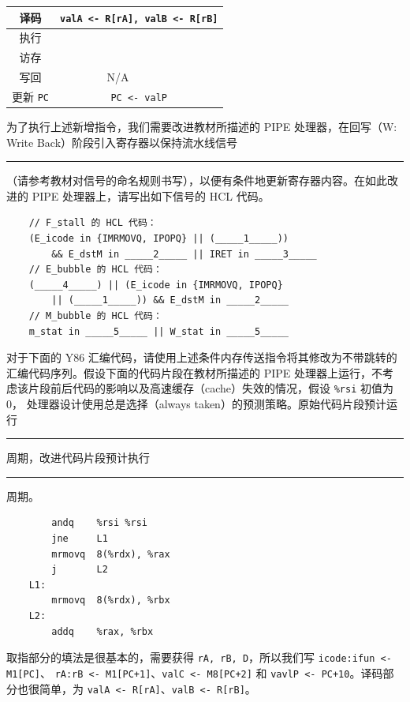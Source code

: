 \begin{problems}
\begin{table}[H]
\begin{tabular}{|c|c|c|}
                译码 & \multicolumn{2}{c|}{\texttt{valA <- R[rA], valB <- R[rB]}} \\ \hline
                执行 & \rule{0pt}{10ex} & \rule{0pt}{10ex} \\ \hline
                访存 & \rule{0pt}{10ex} & \rule{0pt}{10ex} \\ \hline
                写回 & N/A & \rule{0pt}{10ex} \\ \hline
                更新 \verb|PC| & \multicolumn{2}{c|}{\texttt{PC <- valP}} \\ \hline
            \end{tabular}
        \end{table}
        \qn 为了执行上述新增指令，我们需要改进教材所描述的 PIPE 处理器，在回写（W: Write Back）阶段引入寄存器以保持流水线信号 \rule{2.5cm}{0.25mm} （请参考教材对信号的命名规则书写），以便有条件地更新寄存器内容。在如此改进的 PIPE 处理器上，请写出如下信号的 HCL 代码。
        \begin{verbatim}
    // F_stall 的 HCL 代码：
    (E_icode in {IMRMOVQ, IPOPQ} || (_____1_____))
        && E_dstM in _____2_____ || IRET in _____3_____
    // E_bubble 的 HCL 代码：
    (_____4_____) || (E_icode in {IMRMOVQ, IPOPQ}
        || (_____1_____)) && E_dstM in _____2_____
    // M_bubble 的 HCL 代码：
    m_stat in _____5_____ || W_stat in _____5_____
        \end{verbatim}
        \qn 对于下面的 Y86 汇编代码，请使用上述条件内存传送指令将其修改为不带跳转的汇编代码序列。假设下面的代码片段在教材所描述的 PIPE 处理器上运行，不考虑该片段前后代码的影响以及高速缓存（cache）失效的情况，假设 \verb|%rsi| 初值为 0， 处理器设计使用总是选择（always taken）的预测策略。原始代码片段预计运行 \rule{2.5cm}{0.25mm} 周期，改进代码片段预计执行 \rule{2.5cm}{0.25mm} 周期。
        \begin{verbatim}
        andq    %rsi %rsi
        jne     L1
        mrmovq  8(%rdx), %rax
        j       L2
    L1:
        mrmovq  8(%rdx), %rbx
    L2:
        addq    %rax, %rbx
        \end{verbatim}
        \sol 取指部分的填法是很基本的，需要获得 \verb|rA, rB, D|，所以我们写 \verb|icode:ifun <- M1[PC]|、 \verb|rA:rB <- M1[PC+1]|、\verb|valC <- M8[PC+2]| 和 \verb|vavlP <- PC+10|。译码部分也很简单，为 \verb|valA <- R[rA]|、\verb|valB <- R[rB]|。
        

\end{problems}
